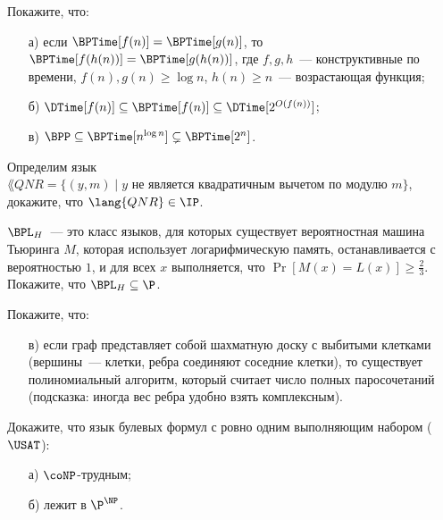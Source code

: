 \begin{ptask}{44}
    Покажите, что:
	\begin{enumerate}[topsep = 0pt, itemsep = -1ex]
        \item [а)] если $\BPTime[f(n)] = \BPTime[g(n)]$, то $\BPTime[f(h(n))] = \BPTime[g(h(n))]$, где $f, g, h$~---
			конструктивные по времени, $f(n), g(n) \ge \log n$, $h(n) \ge n$~--- возрастающая функция;
        \item [б)] $\DTime[f(n)] \subseteq \BPTime[f(n)] \subseteq \DTime[2^{O(f(n))}]$;
        \item [в)] $\BPP \subseteq \BPTime[n^{\log n}] \subsetneq \BPTime[2^n]$.
    \end{enumerate}
\end{ptask}

\begin{ptask}{45}
    Определим язык $\lang{QNR} = \{(y, m) \mid \text{$y$ не является квадратичным вычетом по модулю $m$}\}$, докажите, что
    $\lang{QNR} \in \IP$.
\end{ptask}

\begin{ptask}{46}
    $\BPL_H$~--- это класс языков, для которых существует вероятностная машина Тьюринга $M$, которая использует логарифмическую
    память, останавливается с вероятностью $1$, и для всех $x$ выполняется, что $\Pr[M(x) = L(x)] \ge \frac{2}{3}$. Покажите, что
    $\BPL_H \subseteq \P$.
\end{ptask}

\begin{ptask}{49}
    Покажите, что:
    \begin{enumerate}[topsep = 0pt, itemsep = -1ex]
        \item [в)] если граф представляет собой шахматную доску с выбитыми клетками
            (вершины~--- клетки, ребра соединяют соседние клетки), то существует
            полиномиальный алгоритм, который считает число полных паросочетаний
            (подсказка: иногда вес ребра удобно взять комплексным).
    \end{enumerate}
\end{ptask}


\begin{ptask}{56}
    Докажите, что язык булевых формул с ровно одним выполняющим набором ($\USAT$):
    \begin{enumerate}[topsep = 0pt, itemsep = -1ex]
        \item [а)] $\coNP$-трудным;
        \item [б)] лежит в $\P^{\NP}$.
    \end{enumerate}
\end{ptask}


